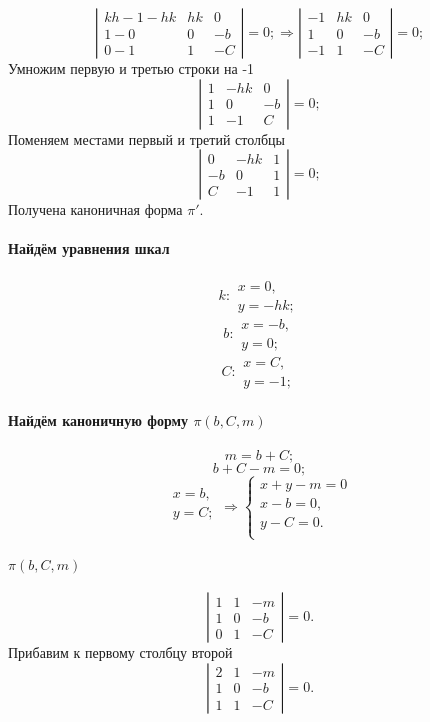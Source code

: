 $$
\left|
\begin{array}{lll}
	kh -1 - hk & hk & 0 \\
	1     - 0  & 0  & -b \\
	0     - 1  & 1  & -C
\end{array}
\right|
=0;
\Rightarrow
\left|
\begin{array}{lll}
	-1 & hk & 0 \\
	1  & 0  & -b \\
	-1 & 1  & -C
\end{array}
\right|
=0;
$$
Умножим первую и третью строки на -1
$$
\left|
\begin{array}{lll}
	1 & -hk & 0 \\
	1 & 0   & -b \\
	1 & -1  & C
\end{array}
\right|
=0;
$$
Поменяем местами первый и третий столбцы
$$
\left|
\begin{array}{lll}
	0  & -hk & 1 \\
	-b  & 0   & 1 \\
	C & -1  & 1 
\end{array}
\right|
=0;
$$
Получена каноничная форма $\pi'$.
\paragraph{Найдём уравнения шкал}
$$k:
\begin{array}{l}
	x = 0,\\
	y = -hk;
\end{array}
$$
$$b:
\begin{array}{l}
	x = -b,\\
	y = 0;
\end{array}
$$
$$C:
\begin{array}{l}
	x = C,\\
	y = -1;
\end{array}
$$

\paragraph{Найдём каноничную форму $\pi(b, C, m)$}

$$m = b + C;$$
$$b + C - m = 0;$$
$$
\begin{array}{l}
x = b,\\
y = C;\\
\end{array}
\Rightarrow
\left\{
	\begin{array}{l}
		x + y - m = 0 \\
		x - b = 0,\\
		y - C = 0.\\
	\end{array}
\right.
$$

\paragraph{$\pi(b, C, m)$}
$$
\left|
\begin{array}{lll}
	1 & 1 & -m \\
	1 & 0 & -b \\
	0 & 1 & -C
\end{array}
\right|
=0.
$$
Прибавим к первому столбцу второй
$$
\left|
\begin{array}{lll}
	2 & 1 & -m \\
	1 & 0 & -b \\
	1 & 1 & -C
\end{array}
\right|
=0.
$$

